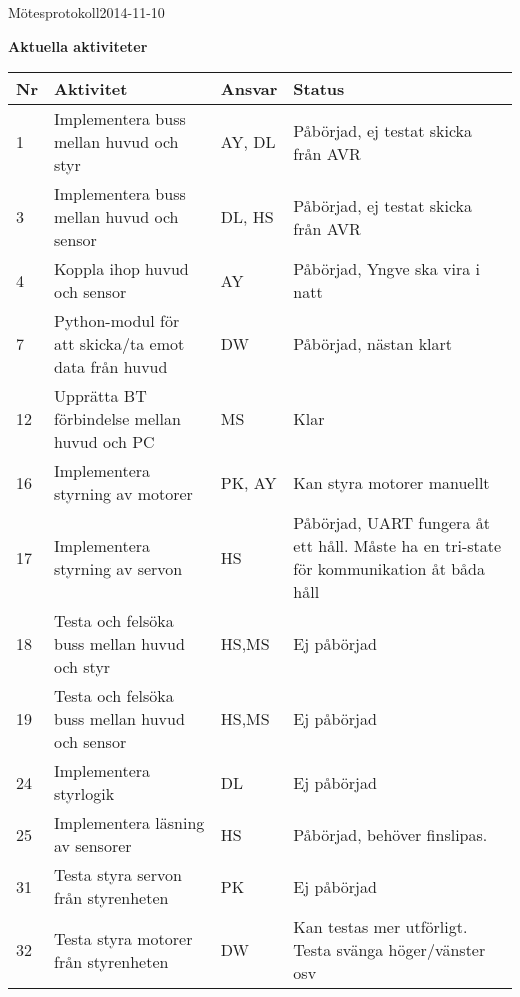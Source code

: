 \documentclass[titlepage, a4paper]{article}
\begin{document}
\begin{projektmote}{Mötesprotokoll}{2014-11-10}
\end{projektmote}

\newpage
\textbf{\Large Aktuella aktiviteter}
\begin{center}
\begin{tabularx}{\textwidth}{| p{4mm} | X | p{13.5mm} | X |}
	\hline
	\textbf{Nr} & \textbf{Aktivitet} & \textbf{Ansvar} & \textbf{Status} \\\hline
	{1} & {Implementera buss mellan huvud och styr} & {AY, DL} & {Påbörjad, ej testat skicka från AVR} \\\hline
	{3} & {Implementera buss mellan huvud och sensor} & {DL, HS} & {Påbörjad, ej testat skicka från AVR} \\\hline
	{4} & {Koppla ihop huvud och sensor} & {AY} & {Påbörjad, Yngve ska vira i natt} \\\hline
	{7} & {Python-modul för att skicka/ta emot data från huvud} & {DW} & {Påbörjad, nästan klart} \\\hline
	{12} & {Upprätta BT förbindelse mellan huvud och PC} & {MS} & {Klar} \\\hline
	{16} & {Implementera styrning av motorer} & {PK, AY} & {Kan styra motorer manuellt} \\\hline
	{17} & {Implementera styrning av servon} & {HS} & {Påbörjad, UART fungera åt ett håll. Måste ha en tri-state för kommunikation åt båda håll} \\\hline
	{18} & {Testa och felsöka buss mellan huvud och styr} & {HS,MS} & {Ej påbörjad} \\\hline
	{19} & {Testa och felsöka buss mellan huvud och sensor} & {HS,MS} & {Ej påbörjad} \\\hline
	{24} & {Implementera styrlogik} & {DL} & {Ej påbörjad} \\\hline
	{25} & {Implementera läsning av sensorer} & {HS} & {Påbörjad, behöver finslipas.} \\\hline
	{31} & {Testa styra servon från styrenheten} & {PK} & {Ej påbörjad} \\\hline
	{32} & {Testa styra motorer från styrenheten} & {DW} & {Kan testas mer utförligt. Testa svänga höger/vänster osv} \\\hline
\end{tabularx}
\end{center}
\end{document}
